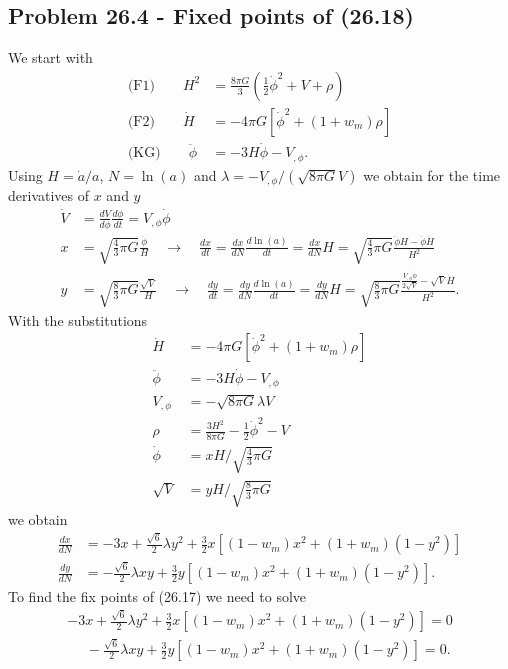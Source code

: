 \documentclass[../main.tex]{subfiles}
\begin{document}
\subsection{Problem 26.4 - Fixed points of (26.18)}
We start with
\begin{align}
    \text{(F1)}\qquad H^2&=\frac{8\pi G}{3}\left(\frac{1}{2}\dot{\phi}^2+V+\rho\right)\\
    \text{(F2)}\qquad \dot{H}&=-4\pi G\left[\dot{\phi}^2+(1+w_m)\rho\right]\\
    \text{(KG)}\qquad \ddot{\phi}&=-3H\dot{\phi}-V_{,\phi}.
\end{align}
Using $H=\dot{a}/a$, $N=\ln(a)$ and $\lambda=-V_{,\phi}/(\sqrt{8\pi G}V)$ we obtain for the time derivatives of $x$ and $y$
\begin{align}
    \dot{V}&=\frac{dV}{d\phi}\frac{d\phi}{dt}=V_{,\phi}\dot{\phi}\\
    x&=\sqrt{\frac{4}{3}\pi G}\frac{\dot{\phi}}{H}\quad\rightarrow\quad\frac{dx}{dt}=\frac{dx}{dN}\frac{d\ln(a)}{dt}
    =\frac{dx}{dN}H
    =\sqrt{\frac{4}{3}\pi G}\frac{\ddot{\phi}H-\dot{\phi}\dot{H}}{H^2}\\
    y&=\sqrt{\frac{8}{3}\pi G}\frac{\sqrt{V}}{H}\quad\rightarrow\quad\frac{dy}{dt}=\frac{dy}{dN}\frac{d\ln(a)}{dt}
    =\frac{dy}{dN}H
    =\sqrt{\frac{8}{3}\pi G}\frac{\frac{V_{,\phi}\dot{\phi}}{2\sqrt{V}}-\sqrt{V}\dot{H}}{H^2}.
\end{align}
With the substitutions
\begin{align}
    \dot{H}&=-4\pi G\left[\dot{\phi}^2+(1+w_m)\rho\right]\\
    \ddot{\phi}&=-3H\dot{\phi}-V_{,\phi}\\
    V_{,\phi}&=-\sqrt{8\pi G}\lambda V\\
    \rho&=\frac{3H^2}{8\pi G}-\frac{1}{2}\dot{\phi}^2-V\\
    \dot{\phi}&=xH/\sqrt{\frac{4}{3}\pi G}\\
    \sqrt{V}&=yH/\sqrt{\frac{8}{3}\pi G}
\end{align}
we obtain
\begin{align}
    \frac{dx}{dN}
    &=-3x+\frac{\sqrt{6}}{2}\lambda y^2+\frac{3}{2}x[(1-w_m)x^2+(1+w_m)(1-y^2)]\\
    \frac{dy}{dN}
    &=-\frac{\sqrt{6}}{2}\lambda xy+\frac{3}{2}y[(1-w_m)x^2+(1+w_m)(1-y^2)].
\end{align}
To find the fix points of (26.17) we need to solve
\begin{align}
    -3x+\frac{\sqrt{6}}{2}\lambda y^2+\frac{3}{2}x[(1-w_m)x^2+(1+w_m)(1-y^2)]=0\\
    \quad\,\,-\frac{\sqrt{6}}{2}\lambda xy+\frac{3}{2}y[(1-w_m)x^2+(1+w_m)(1-y^2)]=0.
\end{align}
\end{document}
